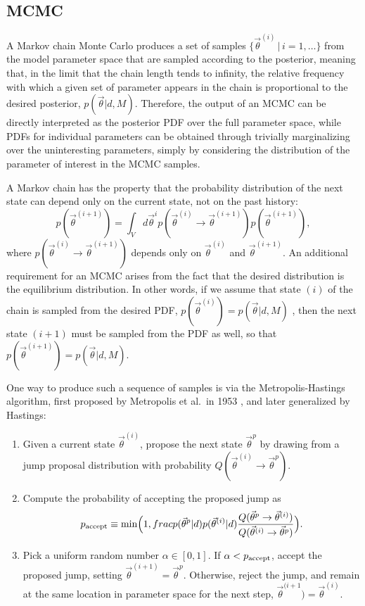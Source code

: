 \documentclass[prd,preprint]{revtex4}
\newcommand{\vtheta}{\vec{\theta}}
\newcommand{\be}{\begin{equation}}
\newcommand{\ee}{\end{equation}}
\begin{document}
\subsection{MCMC} \label{sec:mcmc}

A Markov chain Monte Carlo produces a set of samples $\{ \vtheta^{(i)} \, | \, i = 1, \ldots \}$ from the model parameter space that are sampled according to the posterior, meaning that, in the limit that the chain length tends to infinity, the relative frequency with which a given set of parameter appears in the chain is proportional to the desired posterior, $p(\vtheta|d,M)$.  Therefore, the output of an MCMC can be directly interpreted as the posterior PDF over the full parameter space, while PDFs for individual parameters can be obtained through trivially marginalizing over the uninteresting parameters, simply by considering the distribution of the parameter of interest in the MCMC samples.

A Markov chain has the property that the probability distribution of the next state can depend only on the current state, not on the past history:
\be
p(\vtheta^{(i+1)})=\int_{V} d\vtheta^{i} p(\vtheta^{(i)} \to \vtheta^{(i+1)}) p(\vtheta^{(i+1)}),
\ee
where $p(\vtheta^{(i)} \to \vtheta^{(i+1)})$ depends only on $\vtheta^{(i)}$ and $\vtheta^{(i+1)}$. 
An additional requirement for an MCMC arises from the fact that the desired distribution is the equilibrium distribution.  In other words, if we assume that state $(i)$ of the chain is sampled from the desired PDF, $p(\vtheta^{(i)})=p(\vtheta|d,M)$ , then the next state $(i+1)$ must be sampled from the PDF as well, so that $p(\vtheta^{(i+1)})=p(\vtheta|d,M)$.  

One way to produce such a sequence of samples is via the Metropolis-Hastings algorithm, first proposed by Metropolis et al.~in 1953 \cite{Metropolis:1953}, and later generalized by Hastings:
\begin{enumerate}
  \item Given a current state $\vtheta^{(i)}$, propose the next state $\vtheta^p$ by drawing from a jump proposal distribution with probability $Q(\vtheta^{(i)} \to \vtheta^p)$.  
  \item Compute the probability of accepting the proposed jump as
\be
p_{\textnormal{accept}}  \equiv \min\Bigl(1,  frac{p(\vtheta^p|d)}{p(\vtheta^{(i)}|d)} \frac{Q(\vtheta^p \to
        \vtheta^{(i)})}{Q(\vtheta^{(i)} \to \vtheta^p)} \Bigr).
\ee
\item Pick a uniform random number $\alpha \in [0,1]$.  If $\alpha<  p_{\textnormal{accept}}$, accept the proposed jump, setting $\vtheta^{(i+1)}=\vtheta^p$.  Otherwise, reject the jump, and remain at the same location in parameter space for the next step, $\vtheta^{(i+1})=\vtheta^{(i)}$.
 \end{enumerate}
 
\end{document}
